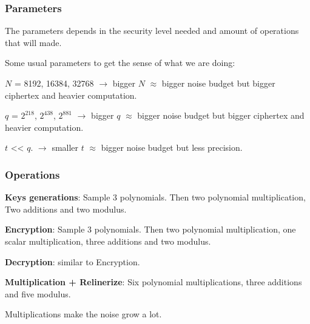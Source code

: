 \documentclass[10pt,handout]{beamer}
\begin{document}
\begin{frame}
\frametitle{Parameters}

The parameters depends in the security level needed and amount of operations that will made.


Some usual parameters to get the sense of what we are doing:

$N$ = 8192, 16384, 32768 $\rightarrow$ bigger $N$ $\approx$ bigger noise budget but bigger ciphertex and heavier computation.

    $q$ = $2^{218}$,   $2^{438}$,  $2^{881}$ $\rightarrow$ bigger $q$ $\approx$ bigger noise budget but bigger ciphertex and heavier computation.

    $t$  << $q$. $\rightarrow$ smaller $t$ $\approx$ bigger noise budget but less precision.



\end{frame}

\begin{frame}
\frametitle{Operations}

    \textbf{Keys generations}: Sample 3 polynomials. Then two polynomial multiplication, Two additions and two modulus.

    \textbf{Encryption}: Sample 3 polynomials. Then two polynomial multiplication, one scalar multiplication, three additions and two modulus.

    \textbf{Decryption}: similar to Encryption.

    \textbf{Multiplication + Relinerize}: Six polynomial multiplications, three additions and five modulus.

   Multiplications make the noise grow a lot.


\end{frame}


\end{document}
